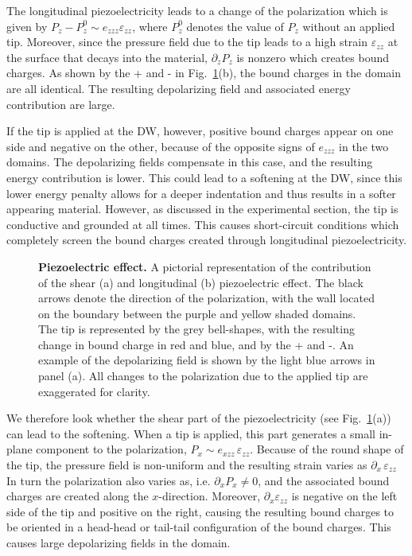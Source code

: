 The longitudinal piezoelectricity leads to a change of the polarization which is given by $P_z - P^0_z \sim e_{zzz} \varepsilon_{zz}$, where $P^0_z$ denotes the value of $P_z$ without an applied tip.
Moreover, since the pressure field due to the tip leads to a high strain $\varepsilon_{zz}$ at the surface that decays into the material, $\partial_{z} P_z$ is nonzero which creates bound charges.
As shown by the + and - in Fig.~\ref{fig:BTO_depolarizing}(b), the bound charges in the domain are all identical.
The resulting depolarizing field and associated energy contribution are large.

If the tip is applied at the DW, however, positive bound charges appear on one side and negative on the other, because of the opposite signs of $e_{zzz}$ in the two domains.
The depolarizing fields compensate in this case, and the resulting energy contribution is lower.
This could lead to a softening at the DW, since this lower energy penalty allows for a deeper indentation and thus results in a softer appearing material.
However, as discussed in the experimental section, the tip is conductive and grounded at all times.
This causes short-circuit conditions which completely screen the bound charges created through longitudinal piezoelectricity.
\begin{figure}[h]
	\caption{\label{fig:BTO_depolarizing}{\bf Piezoelectric effect.} A pictorial representation of the contribution of the shear (a) and longitudinal (b) piezoelectric effect. The black arrows denote the direction of the polarization, with the wall located on the boundary between the purple and yellow shaded domains. The tip is represented by the grey bell-shapes, with the resulting change in bound charge in red and blue, and by the + and -. An example of the depolarizing field is shown by the light blue arrows in panel (a). All changes to the polarization due to the applied tip are exaggerated for clarity.}
\end{figure}

We therefore look whether the shear part of the piezoelectricity (see Fig.~\ref{fig:BTO_depolarizing}(a)) can lead to the softening.
When a tip is applied, this part generates a small in-plane component to the polarization, $P_x \sim e_{xzz}\,\varepsilon_{zz}$.
Because of the round shape of the tip, the pressure field is non-uniform and the resulting strain varies as $\partial_x\,\varepsilon_{zz}$
In turn the polarization also varies as, i.e. $\partial_x P_x\neq 0$, and the associated bound charges are created along the $x$-direction.
Moreover, $\partial_x \varepsilon_{zz}$ is negative on the left side of the tip and positive on the right, causing the resulting bound charges to be oriented in a head-head or tail-tail configuration of the bound charges.
This causes large depolarizing fields in the domain.

